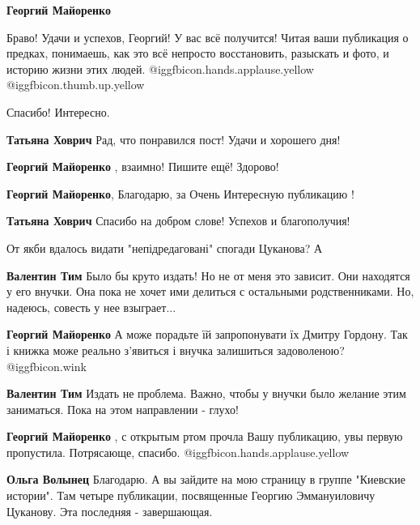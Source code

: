 \begin{itemize}
\begin{itemize}
\textbf{Георгий Майоренко}

Браво! Удачи и успехов, Георгий!
У вас всё получится! Читая ваши публикация о предках, понимаешь, как это всё непросто восстановить, разыскать и фото, и историю жизни этих людей. @igg{fbicon.hands.applause.yellow}  @igg{fbicon.thumb.up.yellow} 
\end{itemize} %

Спасибо! Интересно.

\begin{itemize} %
\textbf{Татьяна Ховрич} Рад, что понравился пост! Удачи и хорошего дня!

\textbf{Георгий Майоренко} , взаимно! Пишите ещё! Здорово!

\textbf{Георгий Майоренко}, Благодарю, за Очень Интересную публикацию !

\textbf{Татьяна Ховрич} Спасибо на добром слове! Успехов и благополучия!
\end{itemize} %

От якби вдалось видати "непідредаговані" спогади Цуканова? А

\begin{itemize} %
\textbf{Валентин Тим} Было бы круто издать! Но не от меня это зависит. Они находятся у его внучки. Она пока не хочет ими делиться с остальными родственниками. Но, надеюсь, совесть у нее взыграет...

\textbf{Георгий Майоренко} А може порадьте їй запропонувати їх Дмитру Гордону. Так і книжка може реально з'явиться і внучка залишиться задоволеною? @igg{fbicon.wink} 

\textbf{Валентин Тим} Издать не проблема. Важно, чтобы у внучки было желание этим заниматься. Пока на этом направлении - глухо!
\end{itemize} %

\textbf{Георгий Майоренко} , с открытым ртом прочла Вашу публикацию, увы первую пропустила. Потрясающе, спасибо. @igg{fbicon.hands.applause.yellow} 

\begin{itemize} %
\textbf{Ольга Волынец} Благодарю. А вы зайдите на мою страницу в группе "Киевские истории". Там четыре публикации, посвященные Георгию Эммануиловичу Цуканову. Эта последняя - завершающая.


\end{itemize}
\end{itemize}
